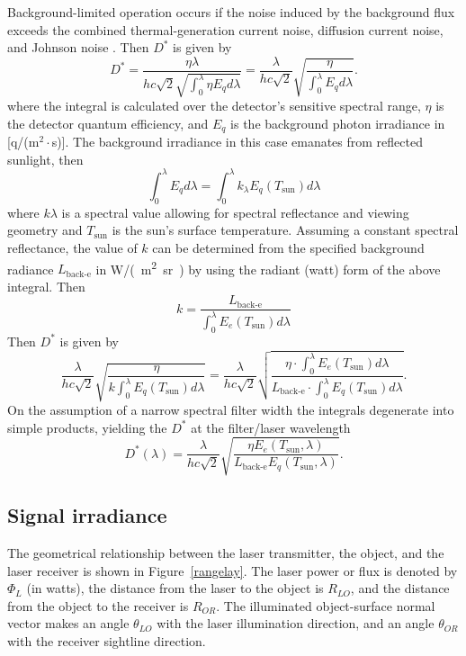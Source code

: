 Background-limited operation occurs if the noise induced by the background flux exceeds the combined thermal-generation current noise, diffusion current noise, and Johnson noise \cite[Section 5.9.5.1]{Willers2013}. Then $D^\ast$ is given by 
\begin{equation}
D^\ast  = \frac
{\eta \lambda}
{hc\sqrt{2}\sqrt{   \int_0^{\lambda}\eta E_q d\lambda  } }
=
\frac
{\lambda} {hc\sqrt{2}}\sqrt{ \frac{\eta}{ \int_0^{\lambda} E_q d\lambda}}.
\label{backqq}
\end{equation}
where the integral is calculated over the detector's sensitive spectral range, 
$\eta$ is the detector quantum efficiency, and $E_q$ 
is the  background photon irradiance in [q/(m$^2\cdot$s)].
The background irradiance in this case emanates from reflected sunlight, then 
\begin{equation}
\int_0^{\lambda} E_q d\lambda=\int_0^{\lambda}k_\lambda E_q (T_\textrm{sun}) d\lambda
\end{equation}
where $k\lambda$ is a spectral value allowing for spectral reflectance and viewing geometry and $T_\textrm{sun}$ is the sun's surface temperature. Assuming a constant spectral reflectance, the value of $k$ can be determined from the specified background radiance $L_\textrm{back-e}$ in \si{\watt/(\metre\squared.\steradian)} by using the radiant (watt) form of the above integral. Then 
\begin{equation}
k=\frac{L_\textrm{back-e}}{\int_0^{\lambda} E_e (T_\textrm{sun}) d\lambda}
\end{equation}
Then $D^\ast$ is given by
\begin{equation}
\frac
{\lambda} {hc\sqrt{2}}\sqrt{ \frac{\eta}{ k\int_0^{\lambda} E_q (T_\textrm{sun}) d\lambda}}
=\frac
{\lambda} {hc\sqrt{2}}
\sqrt{\frac{\eta\cdot\int_0^{\lambda} E_e (T_\textrm{sun}) d\lambda}{L_\textrm{back-e}\cdot\int_0^{\lambda}E_q (T_\textrm{sun}) d\lambda}}.
\label{backqqaa}
\end{equation}
On the assumption of a narrow spectral filter width the integrals degenerate into simple products, yielding the $D^\ast$ at the filter/laser wavelength
\begin{equation}
D^\ast(\lambda)
=\frac
{\lambda} {hc\sqrt{2}}
\sqrt{\frac{\eta E_e (T_\textrm{sun},\lambda)}{L_\textrm{back-e}E_q (T_\textrm{sun},\lambda) }}.
\label{backqqab}
\end{equation}

\subsection{Signal irradiance}
\noindent
The geometrical relationship between the laser transmitter, the object, and the laser receiver is shown in Figure~\ref{rangelay}. The laser power or flux is denoted by $\Phi_L$ (in watts), the distance from the laser to the object is $R_{LO}$, and the distance from the object to the receiver is $R_{OR}$. The illuminated object-surface normal vector makes an angle $\theta_{LO}$ with the laser illumination direction, and an angle $\theta_{OR}$ with the receiver sightline direction.

